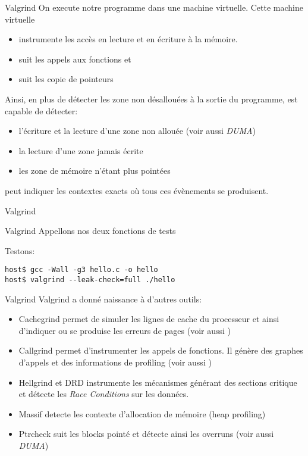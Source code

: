 \begin{frame}[fragile=singleslide]{Valgrind}
  On execute notre programme dans une machine virtuelle. Cette machine
  virtuelle
  \begin{itemize}
  \item instrumente les accès en lecture et en écriture à la mémoire.
  \item suit les appels aux fonctions  et 
  \item suit les copie de pointeurs
  \end{itemize}
  Ainsi, en plus  de détecter les zone non désallouées  à la sortie du
  programme,  est capable de détecter:
  \begin{itemize}
  \item l'écriture  et la lecture  d'une zone non allouée  (voir aussi
    \emph{DUMA})
  \item la lecture d'une zone jamais écrite
  \item les zone de mémoire n'étant plus pointées
  \end{itemize}
    peut  indiquer  les  contextes exacts  où  tous  ces
  évènements se produisent.
\end{frame}

\begin{frame}[fragile=singleslide]{Valgrind}
  
\end{frame}

\begin{frame}[fragile=singleslide]{Valgrind}
  Appellons nos deux fonctions de tests
  
  Testons:
  \begin{lstlisting}
host$ gcc -Wall -g3 hello.c -o hello
host$ valgrind --leak-check=full ./hello
  \end{lstlisting}
\end{frame}

\begin{frame}[fragile=singleslide]{Valgrind}
  Valgrind a donné naissance à d'autres outils:
  \begin{itemize}
  \item Cachegrind permet de simuler les lignes de cache du processeur
    et  ainsi d'indiquer  ou se  produise les  erreurs de  pages (voir
    aussi )
  \item Callgrind  permet d'instrumenter  les appels de  fonctions. Il
    génère des graphes d'appels et des informations de profiling (voir
    aussi )
  \item  Hellgrind  et DRD  instrumente  les  mécanismes générant  des
    sections critique  et détecte  les \emph{Race Conditions}  sur les
    données.
  \item  Massif detecte  les  contexte d'allocation  de mémoire  (heap
    profiling)
  \item Ptrcheck suit les blocks  pointé et détecte ainsi les overruns
    (voir aussi \emph{DUMA})
  \end{itemize}
\end{frame}


